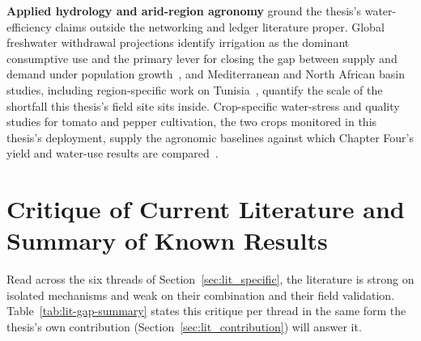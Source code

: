 \documentclass[12pt,a4paper,oneside]{book}
\begin{document}
\textbf{Applied hydrology and arid-region agronomy} ground the thesis's
water-efficiency claims outside the networking and ledger literature
proper. Global freshwater withdrawal projections identify irrigation as
the dominant consumptive use and the primary lever for closing the gap
between supply and demand under
population growth~\cite{fao2050, un_water2023}, and Mediterranean and North
African basin studies, including region-specific work on
Tunisia~\cite{tunisia_water_report, adeloye2021tunisiaAgro,
benali2024tunisiaWater, shanhong2021water}, quantify the scale of the
shortfall this thesis's field site sits inside. Crop-specific water-stress
and quality studies for tomato and pepper cultivation, the two crops
monitored in this thesis's deployment, supply the agronomic baselines
against which Chapter Four's yield and water-use results are
compared~\cite{mdpi_tunisia_tomato, jaeid_pepper, fao_tomato_guide,
safeer2024tomato, wang2025pepper, tia2020waterstress,
pepper2021moisturecontrol, capsicumspacing2017study, precision2020yield,
pepperquality2019irrigation}.

\section{Critique of Current Literature and Summary of Known Results}
\label{sec:lit_critique}

Read across the six threads of Section~\ref{sec:lit_specific}, the
literature is strong on isolated mechanisms and weak on their combination
and their field validation. Table~\ref{tab:lit-gap-summary} states this
critique per thread in the same form the thesis's own contribution
(Section~\ref{sec:lit_contribution}) will answer it.
\end{document}
